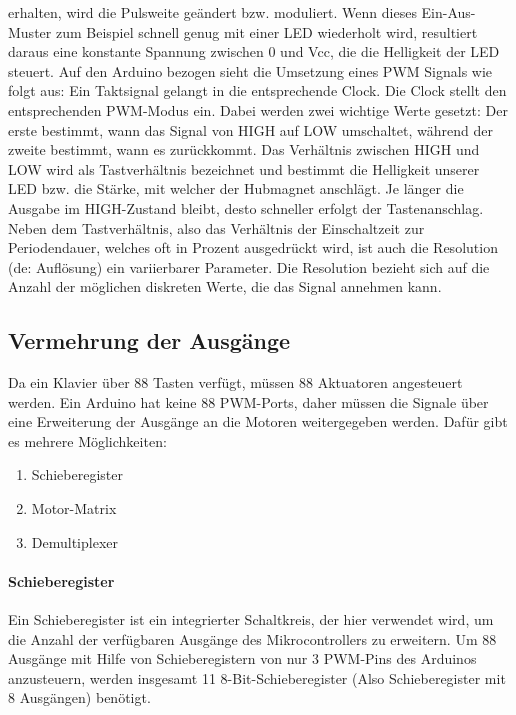 erhalten, wird die Pulsweite geändert bzw. moduliert. Wenn dieses Ein-Aus-Muster zum Beispiel schnell genug mit einer LED
wiederholt wird, resultiert daraus eine konstante Spannung zwischen 0 und Vcc, die die Helligkeit
der LED steuert. \newline
Auf den Arduino bezogen sieht die Umsetzung eines PWM Signals wie folgt aus:
Ein Taktsignal gelangt in die entsprechende Clock.
Die Clock stellt den entsprechenden PWM-Modus ein. Dabei werden zwei wichtige Werte gesetzt:
Der erste bestimmt, wann das Signal von HIGH auf LOW
umschaltet, während der zweite bestimmt, wann es zurückkommt. Das Verhältnis zwischen HIGH und LOW wird als
Tastverhältnis bezeichnet und bestimmt die Helligkeit unserer LED bzw. die Stärke, mit welcher der Hubmagnet anschlägt.
Je länger die Ausgabe im HIGH-Zustand bleibt, desto schneller erfolgt der Tastenanschlag. \newline
Neben dem Tastverhältnis, also das Verhältnis der Einschaltzeit zur
Periodendauer, welches oft in Prozent ausgedrückt wird, ist auch die Resolution (de: Auflösung) ein variierbarer Parameter.
Die Resolution bezieht sich auf die Anzahl der möglichen diskreten Werte, die das Signal annehmen kann.


\subsection{Vermehrung der Ausgänge}\label{output}
Da ein Klavier über 88 Tasten verfügt, müssen 88 Aktuatoren angesteuert werden. Ein Arduino hat keine 88 PWM-Ports, daher
müssen die Signale über eine Erweiterung der Ausgänge an die Motoren weitergegeben werden. Dafür gibt es mehrere Möglichkeiten:

\begin{enumerate}
	\item Schieberegister
	\item Motor-Matrix
	\item Demultiplexer
\end{enumerate}

\paragraph{Schieberegister}
Ein Schieberegister ist ein integrierter Schaltkreis, der hier verwendet wird, um die Anzahl der verfügbaren Ausgänge des
Mikrocontrollers zu erweitern. \newline
Um 88 Ausgänge mit Hilfe von Schieberegistern von nur 3 PWM-Pins des Arduinos anzusteuern, werden insgesamt 11 8-Bit-Schieberegister
(Also Schieberegister mit 8 Ausgängen) benötigt.\newline


